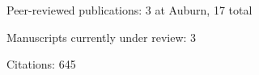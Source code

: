 \begin{veryTightItemize}
    \item Peer-reviewed publications: 3 at Auburn, 17 total
    \item Manuscripts currently under review: 3
    \item Citations: 645
\end{veryTightItemize}
